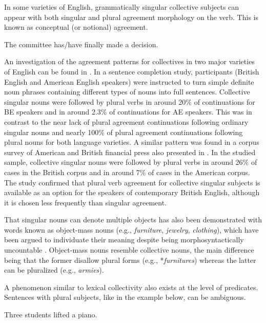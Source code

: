 \documentclass[output=paper]{langscibook}
\begin{document}
In some varieties of English, grammatically singular collective subjects can appear with both singular and plural agreement morphology on the verb. This is known as conceptual (or notional) agreement.

\ea The committee has/have finally made a decision.
\z

\noindent An investigation of the agreement patterns for collectives in two major varieties of English can be found in \citet{bockNumberAgreementBritish2006}. In a sentence completion study, participants (British English and American English speakers) were instructed to turn simple definite noun phrases containing different types of nouns into full sentences. Collective singular nouns were followed by plural verbs in around 20\% of continuations for BE speakers and in around 2.3\% of continuations for AE speakers. This was in contrast to the near lack of plural agreement continuations following ordinary singular nouns and nearly 100\% of plural agreement continuations following plural nouns for both language varieties. A similar pattern was found in a corpus survey of American and British financial press also presented in \citet{bockNumberAgreementBritish2006}. In the studied sample, collective singular nouns were followed by plural verbs in around 26\% of cases in the British corpus and in around 7\% of cases in the American corpus. The study confirmed that plural verb agreement for collective singular subjects is available as an option for the speakers of contemporary British English, although it is chosen less frequently than singular agreement. 

That singular nouns can denote multiple objects has also been demonstrated with words known as object-mass nouns (e.g., \textit{furniture}, \textit{jewelry}, \textit{clothing}), which have been argued to individuate their meaning despite being morphosyntactically uncountable \citep{aBarnerQuantityjudgmentsindividuation2005}. Object-mass nouns resemble collective nouns, the main difference being that the former disallow plural forms (e.g., *\textit{furnitures}) whereas the latter can be pluralized (e.g., \textit{armies}).

A phenomenon similar to lexical collectivity also exists at the level of predicates. Sentences with plural subjects, like in the example below, can be ambiguous. 

\ea Three students lifted a piano.
\z
\end{document}
